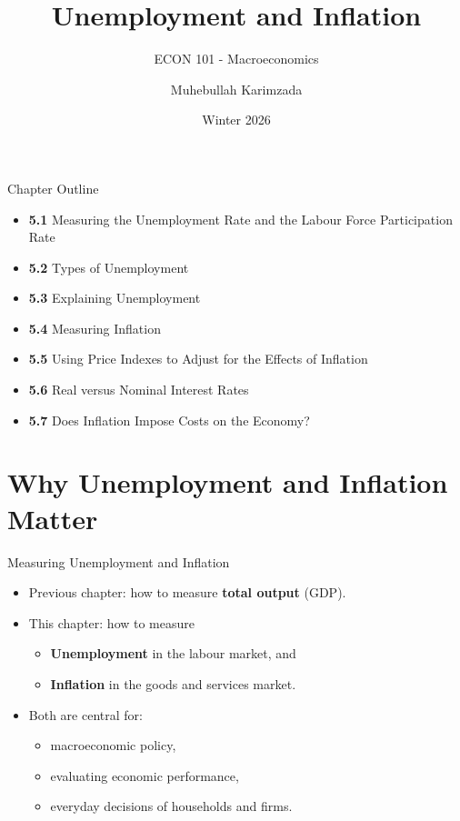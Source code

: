 \documentclass[aspectratio=169]{beamer}
\title{\textbf{Unemployment and Inflation \vspace{.5cm}\\  }}
\subtitle{ {\large ECON 101 - Macroeconomics}}
\author{Muhebullah Karimzada}
\date{Winter 2026}
\begin{document}
\begin{frame}[plain]
  \titlepage
\end{frame}

\begin{frame}{Chapter Outline}
\transfade
\begin{itemize}
  \item \textbf{5.1} Measuring the Unemployment Rate and the Labour Force Participation Rate
  \item \textbf{5.2} Types of Unemployment
  \item \textbf{5.3} Explaining Unemployment
  \item \textbf{5.4} Measuring Inflation
  \item \textbf{5.5} Using Price Indexes to Adjust for the Effects of Inflation
  \item \textbf{5.6} Real versus Nominal Interest Rates
  \item \textbf{5.7} Does Inflation Impose Costs on the Economy?
\end{itemize}
\end{frame}

\section*{Why Unemployment and Inflation Matter}

\begin{frame}{Measuring Unemployment and Inflation}
\transfade
\begin{itemize}
  \item Previous chapter: how to measure \textbf{total output} (GDP).
  \item This chapter: how to measure
  \begin{itemize}
    \item \textbf{Unemployment} in the labour market, and
    \item \textbf{Inflation} in the goods and services market.
  \end{itemize}
  \item Both are central for:
  \begin{itemize}
    \item macroeconomic policy,
    \item evaluating economic performance,
    \item everyday decisions of households and firms.
  \end{itemize}
\end{itemize}
\end{frame}
\end{document}
